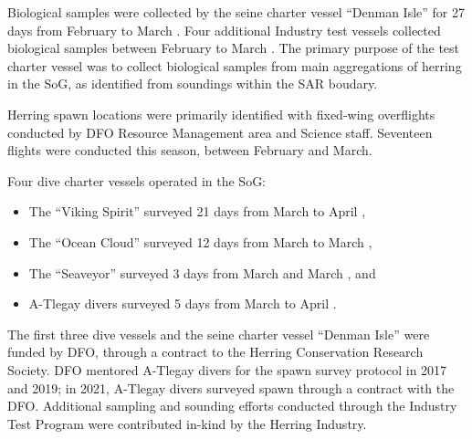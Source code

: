 Biological samples were collected by the seine charter vessel ``Denman Isle''
for 27 days from February  to March .
Four additional Industry test vessels collected biological samples
between February  to March .
The primary purpose of the test charter vessel was to
collect biological samples from main aggregations of herring in the SoG,
as identified from soundings within the SAR boudary. 

Herring spawn locations were primarily identified with fixed-wing overflights
conducted by DFO Resource Management area and Science staff.
Seventeen flights were conducted this season, between February and March.

Four dive charter vessels operated in the SoG:
\begin{itemize}
\item The ``Viking Spirit'' surveyed 21 days from March  to April ,
\item The ``Ocean Cloud'' surveyed 12 days from March  to March ,
\item The ``Seaveyor'' surveyed 3 days from March  and March , and
\item A-Tlegay divers surveyed 5 days from March  to April .
\end{itemize}
The first three dive vessels and the seine charter vessel ``Denman Isle''
were funded by DFO, through a contract to the Herring Conservation Research Society.
DFO mentored A-Tlegay divers for the spawn survey protocol in 2017 and 2019;
in 2021, A-Tlegay divers surveyed spawn through a contract with the DFO.
Additional sampling and sounding efforts conducted through the
Industry Test Program were contributed in-kind by the Herring Industry.

